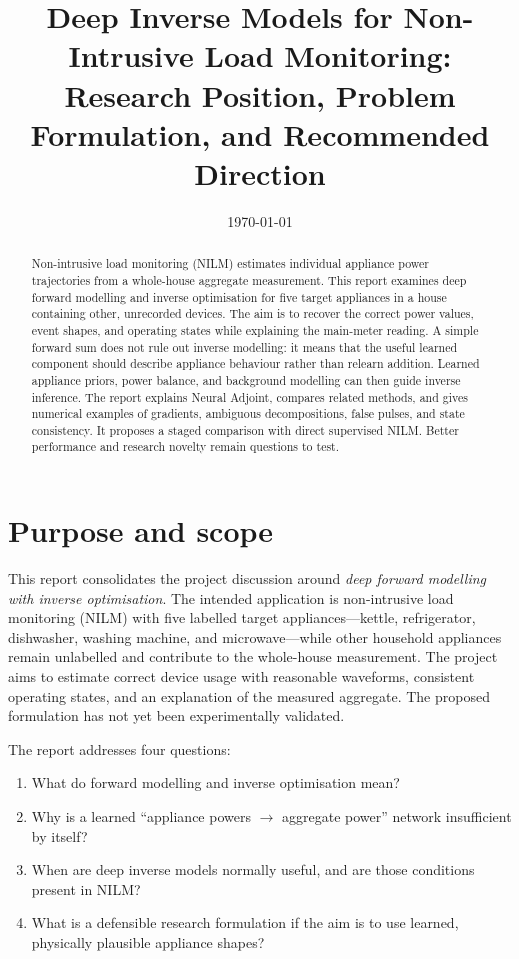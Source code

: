 \documentclass[11pt]{article}
\title{Deep Inverse Models for Non-Intrusive Load Monitoring:\\
Research Position, Problem Formulation, and Recommended Direction}
\author{}
\date{\today}
\begin{document}
\maketitle

\begin{abstract}
Non-intrusive load monitoring (NILM) estimates individual appliance power trajectories from a whole-house aggregate measurement. This report examines deep forward modelling and inverse optimisation for five target appliances in a house containing other, unrecorded devices. The aim is to recover the correct power values, event shapes, and operating states while explaining the main-meter reading. A simple forward sum does not rule out inverse modelling: it means that the useful learned component should describe appliance behaviour rather than relearn addition. Learned appliance priors, power balance, and background modelling can then guide inverse inference. The report explains Neural Adjoint, compares related methods, and gives numerical examples of gradients, ambiguous decompositions, false pulses, and state consistency. It proposes a staged comparison with direct supervised NILM. Better performance and research novelty remain questions to test.
\end{abstract}

\section{Purpose and scope}

This report consolidates the project discussion around \emph{deep forward modelling with inverse optimisation}. The intended application is non-intrusive load monitoring (NILM) with five labelled target appliances---kettle, refrigerator, dishwasher, washing machine, and microwave---while other household appliances remain unlabelled and contribute to the whole-house measurement. The project aims to estimate correct device usage with reasonable waveforms, consistent operating states, and an explanation of the measured aggregate. The proposed formulation has not yet been experimentally validated.

The report addresses four questions:
\begin{enumerate}[label=(\arabic*)]
    \item What do forward modelling and inverse optimisation mean?
    \item Why is a learned ``appliance powers $\rightarrow$ aggregate power'' network insufficient by itself?
    \item When are deep inverse models normally useful, and are those conditions present in NILM?
    \item What is a defensible research formulation if the aim is to use learned, physically plausible appliance shapes?
\end{enumerate}
\end{document}
